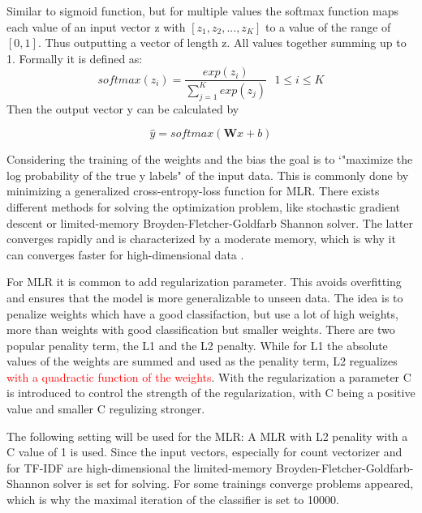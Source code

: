 \documentclass[12pt, a4paper, titlepage]{article}
\begin{document}
Similar to sigmoid function, but for multiple values the softmax function maps each value of an input vector z with $[z_1, z_2, ..., z_K]$ to a value of the range of $[0,1]$. Thus outputting a vector of length z. All values together summing up to 1. Formally it is defined as: 
\[ softmax(z_i) = \frac{exp(z_i)}{\sum^K_{j=1} exp(z_j)} \text{ } 1 \leq i \leq K \]
Then the output vector y can be calculated by 

\[ \hat{y} = softmax(\textbf{W}x+b) \]

Considering the training of the weights and the bias the goal is to `"maximize the log probability of the true y labels" of the input data. This is commonly done by minimizing a generalized cross-entropy-loss function for \ac{MLR}. There exists different methods for solving the optimization problem, like stochastic gradient descent or limited-memory Broyden-Fletcher-Goldfarb Shannon solver. The latter converges rapidly and is characterized by a moderate memory, which is why it can converges faster for high-dimensional data \citep{fei2014, scikit-learn}. 

For \ac{MLR} it is common to add regularization parameter. This avoids overfitting and ensures that the model is more generalizable to unseen data. The idea is to penalize weights which have a good classifaction, but use a lot of high weights, more than weights with good classification but smaller weights. There are two popular penality term, the L1 and the L2 penalty. 
While for L1 the absolute values of the weights are summed and used as the penality term, L2 regualizes \textcolor{red}{with a quadractic function of the weights}. With the regularization a parameter C is introduced to control the strength of the regularization, with C being a positive value and smaller C regulizing stronger. 

The following setting will be used for the \ac{MLR}: A \ac{MLR} with L2 penality with a C value of 1 is used. Since the input vectors, especially for count vectorizer and for \ac{TF-IDF} are high-dimensional the limited-memory Broyden-Fletcher-Goldfarb-Shannon solver is set for solving. For some trainings converge problems appeared, which is why the maximal iteration of the classifier is set to 10000.
\end{document}
